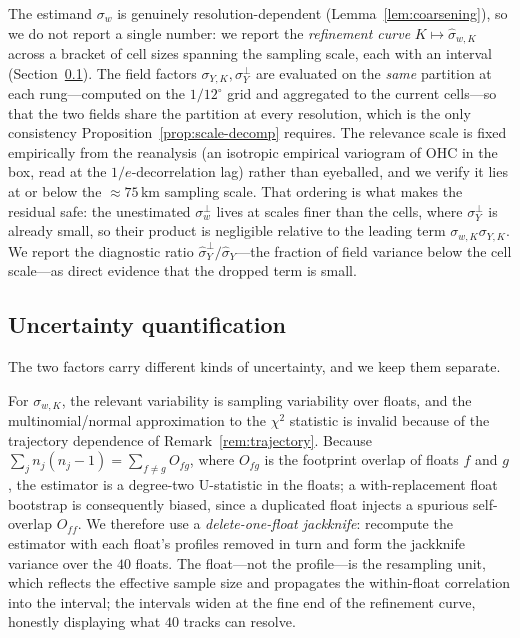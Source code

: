 The estimand $\sigma_w$ is genuinely resolution-dependent
(Lemma~\ref{lem:coarsening}), so we do not report a single number: we
report the \emph{refinement curve} $K\mapsto\hat\sigma_{w,K}$ across a
bracket of cell sizes spanning the sampling scale, each with an
interval (Section~\ref{sec:uncertainty}). The field factors
$\sigma_{Y,K},\sigma_Y^{\perp}$ are evaluated on the \emph{same}
partition at each rung---computed on the $1/12^\circ$ grid and
aggregated to the current cells---so that the two fields share the
partition at every resolution, which is the only consistency
Proposition~\ref{prop:scale-decomp} requires. The relevance scale is
fixed empirically from the reanalysis (an isotropic empirical variogram
of OHC in the box, read at the $1/e$-decorrelation lag) rather than
eyeballed, and we verify it lies at or below the ${\approx}75$\,km
sampling scale. That ordering is what makes the residual safe: the
unestimated $\sigma_w^{\perp}$ lives at scales finer than the cells,
where $\sigma_Y^{\perp}$ is already small, so their product is
negligible relative to the leading term $\sigma_{w,K}\sigma_{Y,K}$. We
report the diagnostic ratio $\hat\sigma_Y^{\perp}/\hat\sigma_Y$---the
fraction of field variance below the cell scale---as direct evidence
that the dropped term is small.

\subsection{Uncertainty quantification}
\label{sec:uncertainty}

The two factors carry different kinds of uncertainty, and we keep them
separate.

For $\sigma_{w,K}$, the relevant variability is sampling variability
over floats, and the multinomial/normal approximation to the $\chi^2$
statistic is invalid because of the trajectory dependence of
Remark~\ref{rem:trajectory}. Because
$\sum_j n_j(n_j-1)=\sum_{f\neq g}O_{fg}$, where $O_{fg}$ is the
footprint overlap of floats $f$ and $g$, the estimator is a degree-two
U-statistic in the floats; a with-replacement float bootstrap is
consequently biased, since a duplicated float injects a spurious
self-overlap $O_{ff}$. We therefore use a \emph{delete-one-float
jackknife}: recompute the estimator with each float's profiles removed
in turn and form the jackknife variance over the $40$ floats. The
float---not the profile---is the resampling unit, which reflects the
effective sample size and propagates the within-float correlation into
the interval; the intervals widen at the fine end of the refinement
curve, honestly displaying what $40$ tracks can resolve.

